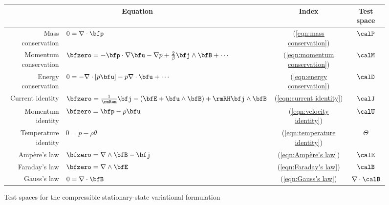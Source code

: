     \begin{figure}
        \centering
        \begin{tabular}{ r l c | c }
            \multicolumn{2}{c}{Equation}  &  Index  &  Test space  \\
            \hline\hline
            Mass conservation  &  $0  =  \nabla\cdot\bfp$  &  (\ref{eqn:mass conservation})  &  $\calP$  \\
            Momentum conservation  &  $\bfzero 
             =  - \bfp\cdot\nabla\bfu - \nabla p + \frac{2}{\beta}\bfj\wedge\bfB + \cdots$  &  (\ref{eqn:momentum conservation})  &  $\calM$  \\
            Energy conservation  &  $0  =  - \nabla\cdot[p\bfu] - p\nabla\cdot\bfu + \cdots$  &  (\ref{eqn:energy conservation})  &  $\calD$  \\
            \hline
            Current identity  &  $\bfzero  =  \frac{1}{\rmRem}\bfj - \left(\bfE + \bfu\wedge\bfB\right) + \rmRH\bfj\wedge\bfB$  &  (\ref{eqn:current identity})  &  $\calJ$  \\
            \hline
            Momentum identity  &  $\bfzero  =  \bfp - \rho\bfu$  &  (\ref{eqn:velocity identity})  &  $\calU$  \\
            Temperature identity  &  $0  =  p - \rho\theta$  &  (\ref{eqn:temperature identity})  &  $\Theta$  \\
            \hline
            Ampère's law  &  $\bfzero  =  \nabla\wedge\bfB - \bfj$  &  (\ref{eqn:Ampère's law})  &  $\calE$  \\
            Faraday's law  &  $\bfzero  =  \nabla\wedge\bfE$  &  (\ref{eqn:Faraday's law})  &  $\calB$  \\
            Gauss's law  &  $0  =  \nabla\cdot\bfB$  &  (\ref{eqn:Gauss's law})  &  $\nabla\cdot\calB$  \\
        \end{tabular}
        \caption{Test spaces for the compressible stationary-state variational formulation}
        \label{fig:compressible stationary-state test spaces}
    \end{figure}

